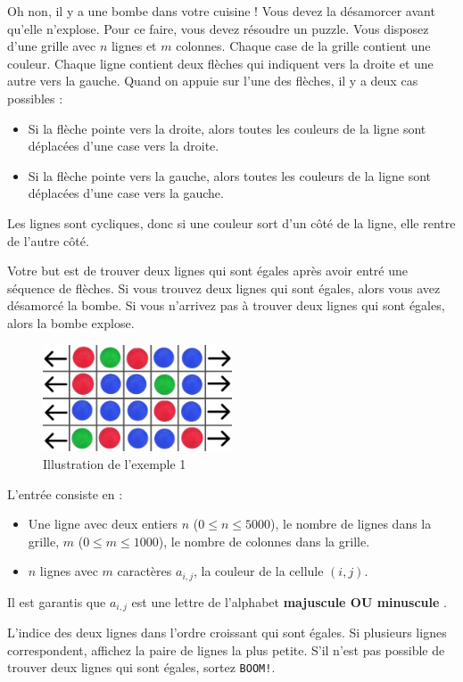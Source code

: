 \problemname{\problemyamlname}


Oh non, il y a une bombe dans votre cuisine ! Vous devez la désamorcer avant qu'elle n'explose. Pour ce faire, vous devez résoudre un puzzle.
Vous disposez d'une grille avec $n$ lignes et $m$ colonnes. Chaque case de la grille contient une couleur. Chaque ligne contient deux flèches qui indiquent vers la droite et une autre vers la gauche.
Quand on appuie sur l'une des flèches, il y a deux cas possibles :
\begin{itemize}
    \item Si la flèche pointe vers la droite, alors toutes les couleurs de la ligne sont déplacées d'une case vers la droite.
    \item Si la flèche pointe vers la gauche, alors toutes les couleurs de la ligne sont déplacées d'une case vers la gauche.
\end{itemize}
Les lignes sont cycliques, donc si une couleur sort d'un côté de la ligne, elle rentre de l'autre côté.

Votre but est de trouver deux lignes qui sont égales après avoir entré une séquence de flèches. Si vous trouvez deux lignes qui sont égales, alors vous avez désamorcé la bombe. Si vous n'arrivez pas à trouver deux lignes qui sont égales, alors la bombe explose.

\begin{figure}[H]
    \centering
    \includegraphics[width=0.5\textwidth]{illustration.png}
    \caption{Illustration de l'exemple 1}
\end{figure}

\begin{Input}
    L'entrée consiste en :
    \begin{itemize}
        \item Une ligne avec deux entiers $n$ ($0\leq n \leq 5000$), le nombre de lignes dans la grille, $m$ ($0 \leq m \leq 1000$), le nombre de colonnes dans la grille.
        \item $n$ lignes avec $m$ caractères $a_{i,j}$, la couleur de la cellule $(i,j)$.
    \end{itemize}
    Il est garantis que $a_{i,j}$ est une lettre de l'alphabet \textbf{majuscule OU minuscule   }.
\end{Input}

\begin{Output}
    L'indice des deux lignes dans l'ordre croissant qui sont égales. Si plusieurs lignes correspondent, affichez la paire de lignes la plus petite. S'il n'est pas possible de trouver deux lignes qui sont égales, sortez \texttt{BOOM!}.
\end{Output}
